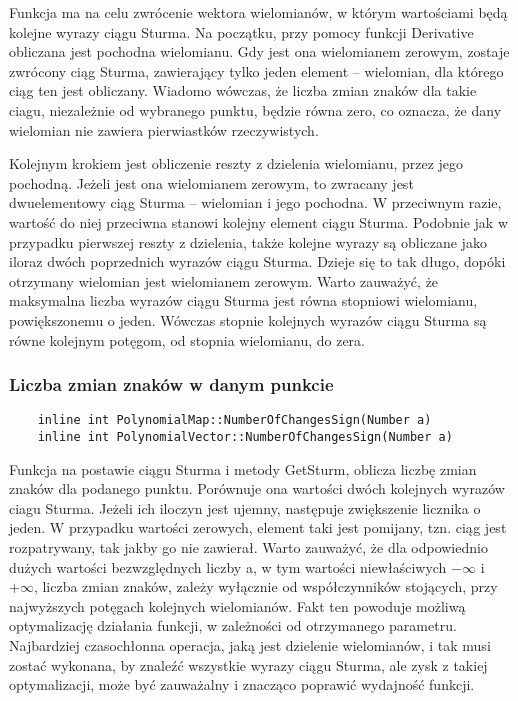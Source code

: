 \documentclass[oneside,a4paper]{book}
\begin{document}
	Funkcja ma na celu zwrócenie wektora wielomianów, w którym wartościami będą kolejne wyrazy ciągu Sturma. Na początku, przy pomocy funkcji Derivative obliczana jest pochodna wielomianu. Gdy jest ona wielomianem zerowym, zostaje zwrócony ciąg Sturma, zawierający tylko jeden element – wielomian, dla którego ciąg ten jest obliczany. Wiadomo wówczas, że liczba zmian znaków dla takie ciagu, niezależnie od wybranego punktu, będzie równa zero, co oznacza, że dany wielomian nie zawiera pierwiastków rzeczywistych.
	
	Kolejnym krokiem jest obliczenie reszty z dzielenia wielomianu, przez jego pochodną. Jeżeli jest ona wielomianem zerowym, to zwracany jest dwuelementowy ciąg Sturma – wielomian i jego pochodna. W przeciwnym razie, wartość do niej przeciwna stanowi kolejny element ciągu Sturma. Podobnie jak w przypadku pierwszej reszty z dzielenia, także kolejne wyrazy są obliczane jako iloraz dwóch poprzednich wyrazów ciągu Sturma. Dzieje się to tak długo, dopóki otrzymany wielomian jest wielomianem zerowym. Warto zauważyć, że maksymalna liczba wyrazów ciągu Sturma jest równa stopniowi wielomianu, powiększonemu o jeden. Wówczas stopnie kolejnych wyrazów ciągu Sturma są równe kolejnym potęgom, od stopnia wielomianu, do zera.
	\\
	
	\subsubsection{Liczba zmian znaków w danym punkcie}
	\begin{lstlisting}
	inline int PolynomialMap::NumberOfChangesSign(Number a)
	inline int PolynomialVector::NumberOfChangesSign(Number a)
	\end{lstlisting}
	
	Funkcja na postawie ciągu Sturma i metody GetSturm, oblicza liczbę zmian znaków dla podanego punktu. Porównuje ona wartości dwóch kolejnych wyrazów ciagu Sturma. Jeżeli ich iloczyn jest ujemny, następuje zwiększenie licznika o jeden. W przypadku wartości zerowych, element taki jest pomijany, tzn. ciąg jest rozpatrywany, tak jakby go nie zawierał. Warto zauważyć, że dla odpowiednio dużych wartości bezwzględnych liczby a, w tym wartości niewłaściwych $-\infty$ i $+\infty$, liczba zmian znaków, zależy wyłącznie od współczynników stojących, przy najwyższych potęgach kolejnych wielomianów. Fakt ten powoduje możliwą optymalizację działania funkcji, w zależności od otrzymanego parametru. Najbardziej czasochłonna operacja, jaką jest dzielenie wielomianów, i tak musi zostać wykonana, by znaleźć wszystkie wyrazy ciągu Sturma, ale zysk z takiej optymalizacji, może być zauważalny i znacząco poprawić wydajność funkcji.
	
\end{document}
